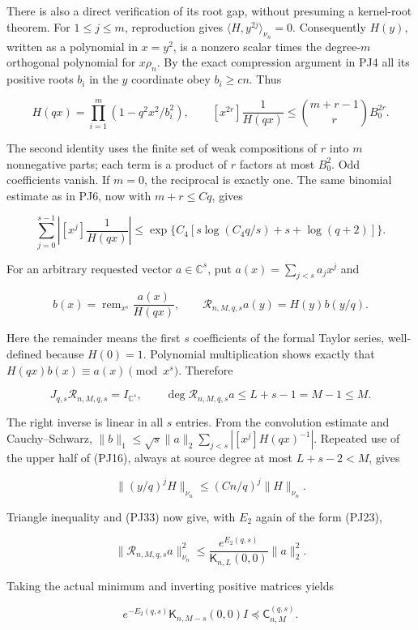 \documentclass[10pt]{article}
\begin{document}
There is also a direct verification of its root gap, without presuming a kernel-root theorem. For \(1\le j\le m\), reproduction gives \(\langle H,y^{2j}\rangle_{\nu_n}=0\). Consequently \(H(y)\), written as a polynomial in \(x=y^2\), is a nonzero scalar times the degree-\(m\) orthogonal polynomial for \(x\rho_n\). By the exact compression argument in PJ4 all its positive roots \(b_i\) in the \(y\) coordinate obey \(b_i\ge cn\). Thus

\[
H(qx)=\prod_{i=1}^m(1-q^2x^2/b_i^2),
\qquad
[x^{2r}]\frac1{H(qx)}
\le\binom{m+r-1}{r}B_0^{2r}.
\tag{PJ32}
\]

The second identity uses the finite set of weak compositions of \(r\) into \(m\) nonnegative parts; each term is a product of \(r\) factors at most \(B_0^2\). Odd coefficients vanish. If \(m=0\), the reciprocal is exactly one. The same binomial estimate as in PJ6, now with \(m+r\le Cq\), gives

\[
\sum_{j=0}^{s-1}\left|[x^j]\frac1{H(qx)}\right|
\le\exp\{C_4[s\log(C_4q/s)+s+\log(q+2)]\}.
\tag{PJ33}
\]

For an arbitrary requested vector \(a\in\mathbb C^s\), put \(a(x)=\sum_{j<s}a_jx^j\) and

\[
b(x)=\operatorname{rem}_{x^s}\frac{a(x)}{H(qx)},
\qquad
\mathcal R_{n,M,q,s}a(y)=H(y)b(y/q).
\tag{PJ34}
\]

Here the remainder means the first \(s\) coefficients of the formal Taylor series, well-defined because \(H(0)=1\). Polynomial multiplication shows exactly that \(H(qx)b(x)\equiv a(x)\pmod{x^s}\). Therefore

\[
J_{q,s}\mathcal R_{n,M,q,s}=I_{\mathbb C^s},
\qquad
\deg\mathcal R_{n,M,q,s}a\le L+s-1=M-1\le M.
\tag{PJ35}
\]

The right inverse is linear in all \(s\) entries. From the convolution estimate and Cauchy--Schwarz, \(\|b\|_1\le\sqrt{s}\|a\|_2\sum_{j<s}|[x^j]H(qx)^{-1}|\). Repeated use of the upper half of (PJ16), always at source degree at most \(L+s-2<M\), gives

\[
\|(y/q)^jH\|_{\nu_n}\le(Cn/q)^j\|H\|_{\nu_n}.
\]

Triangle inequality and (PJ33) now give, with \(E_2\) again of the form (PJ23),

\[
\|\mathcal R_{n,M,q,s}a\|_{\nu_n}^2
\le\frac{e^{E_2(q,s)}}{\mathsf K_{n,L}(0,0)}\|a\|_2^2.
\tag{PJ36}
\]

Taking the actual minimum and inverting positive matrices yields

\[
e^{-E_2(q,s)}\mathsf K_{n,M-s}(0,0)I
\preceq\mathsf C_{n,M}^{(q,s)}.
\tag{PJ37}
\]
\end{document}
